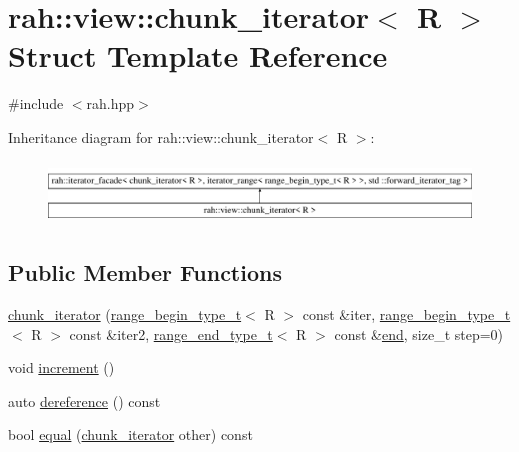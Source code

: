 \hypertarget{structrah_1_1view_1_1chunk__iterator}{}\section{rah\+::view\+::chunk\+\_\+iterator$<$ R $>$ Struct Template Reference}
\label{structrah_1_1view_1_1chunk__iterator}


{\ttfamily \#include $<$rah.\+hpp$>$}

Inheritance diagram for rah\+::view\+::chunk\+\_\+iterator$<$ R $>$\+:\begin{figure}[H]
\begin{center}
\leavevmode
\includegraphics[height=1.656805cm]{structrah_1_1view_1_1chunk__iterator}
\end{center}
\end{figure}
\subsection*{Public Member Functions}
\begin{DoxyCompactItemize}
\item 
\mbox{\hyperlink{structrah_1_1view_1_1chunk__iterator_a2675282334475c594c96fdcc6c646895}{chunk\+\_\+iterator}} (\mbox{\hyperlink{namespacerah_a28aff4eeddcece6be65ff0b956d32d4a}{range\+\_\+begin\+\_\+type\+\_\+t}}$<$ R $>$ const \&iter, \mbox{\hyperlink{namespacerah_a28aff4eeddcece6be65ff0b956d32d4a}{range\+\_\+begin\+\_\+type\+\_\+t}}$<$ R $>$ const \&iter2, \mbox{\hyperlink{namespacerah_a9657e24ae477f4482225b133fe286b65}{range\+\_\+end\+\_\+type\+\_\+t}}$<$ R $>$ const \&\mbox{\hyperlink{namespacerah_aaddd1442cd76b96876e692cdefe7261d}{end}}, size\+\_\+t step=0)
\item 
void \mbox{\hyperlink{structrah_1_1view_1_1chunk__iterator_a5159787ea568a933e219a9218daf3e61}{increment}} ()
\item 
auto \mbox{\hyperlink{structrah_1_1view_1_1chunk__iterator_ad552c568bb914a6107bdcb19a5b9aa88}{dereference}} () const
\item 
bool \mbox{\hyperlink{structrah_1_1view_1_1chunk__iterator_a30a848e24020b169cf18626b2034adaf}{equal}} (\mbox{\hyperlink{structrah_1_1view_1_1chunk__iterator}{chunk\+\_\+iterator}} other) const
\end{DoxyCompactItemize}
